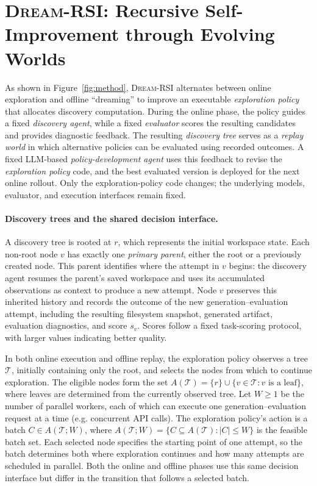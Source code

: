 

\section{\textsc{Dream-RSI}: Recursive Self-Improvement through Evolving Worlds}
\label{sec:replay-based-controller-improvement}


As shown in Figure~\ref{fig:method}, \textsc{Dream-RSI} alternates
between online exploration and offline ``dreaming'' to improve an
executable \emph{exploration policy} that allocates discovery computation.
During the online phase, the policy guides a fixed \emph{discovery agent}, while a fixed
\emph{evaluator} scores the resulting candidates and provides diagnostic
feedback. The resulting \emph{discovery tree} serves as a \emph{replay
world} in which alternative policies can be evaluated using recorded
outcomes. A fixed LLM-based \emph{policy-development agent} uses this
feedback to revise the \emph{exploration policy} code, and the best evaluated version is
deployed for the next online rollout. Only the exploration-policy code
changes; the underlying models, evaluator, and execution interfaces
remain fixed.

\paragraph{Discovery trees and the shared decision interface.}
A discovery tree is rooted at \(r\), which represents the initial
workspace state. Each non-root node \(v\) has exactly one
\emph{primary parent}, either the root or a previously created node.
This parent identifies where the attempt in \(v\) begins:
the discovery agent resumes the parent's saved workspace and uses
its accumulated observations as context to produce a new attempt. Node \(v\) preserves this
inherited history and records the outcome of the new
generation--evaluation attempt, including the resulting filesystem
snapshot, generated artifact, evaluation diagnostics, and score \(s_v\).
Scores follow a fixed task-scoring protocol, with larger values
indicating better quality.

In both online execution and offline replay, the exploration policy
observes a tree \(\mathcal T\), initially containing only the root,
and selects the nodes from which to continue exploration.
The eligible nodes form the set
\(A(\mathcal T)=\{r\}\cup\{v\in\mathcal T:v\text{ is a leaf}\}\),
where leaves are determined from the currently observed tree.
Let \(W\geq 1\) be the number of parallel workers, each of which can
execute one generation--evaluation request at a time (e.g. concurrent API calls).
The exploration policy's action is a batch \(C\in A(\mathcal T;W)\), where
\(A(\mathcal T;W)=\{C\subseteq A(\mathcal T):|C|\leq W\}\) is the feasible batch set.
Each selected node specifies the starting point of one attempt,
so the batch determines both where exploration continues and
how many attempts are scheduled in parallel. Both the online and offline phases use this same decision interface but differ in the
transition that follows a selected batch.

